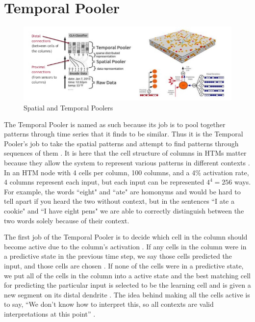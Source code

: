 \documentclass[oneside,12pt,openany]{book}
\begin{document}
	
	\section{Temporal Pooler}
	
	\begin{figure}[h!]
		\centering
		\includegraphics[width=\linewidth]{images/Poolers.jpg}
		\caption{Spatial and Temporal Poolers}
		\label{fig 2}
	\end{figure}
	
	The Temporal Pooler is named as such because its job is to pool together patterns through time series that it finds to be similar. Thus it is the Temporal Pooler's job to take the spatial patterns and attempt to find patterns through sequences of them \cite{Principles}. It is here that the cell structure of columns in HTMs matter because they allow the system to represent various patterns in different contexts \cite{Principles}. In an HTM node with 4 cells per column, 100 columns, and a 4\% activation rate, 4 columns represent each input, but each input can be represented $4^{4}=256$ ways. For example, the words ``eight" and ``ate" are homonyms and would be hard to tell apart if you heard the two without context, but in the sentences ``I ate a cookie" and ``I have eight pens" we are able to correctly distinguish between the two words solely because of their context.
	
	The first job of the Temporal Pooler is to decide which cell in the column should become active due to the column's activation \cite{Principles}. If any cells in the column were in a predictive state in the previous time step, we say those cells predicted the input, and those cells are chosen \cite{Whitepaper}. If none of the cells were in a predictive state, we put all of the cells in the column into a active state and the best matching cell for predicting the particular input is selected to be the learning cell and is given a new segment on its distal dendrite \cite{Whitepaper}. The idea behind making all the cells active is to say, ``We don't know how to interpret this, so all contexts are valid interpretations at this point'' \cite{Principles}.
	
\end{document}
